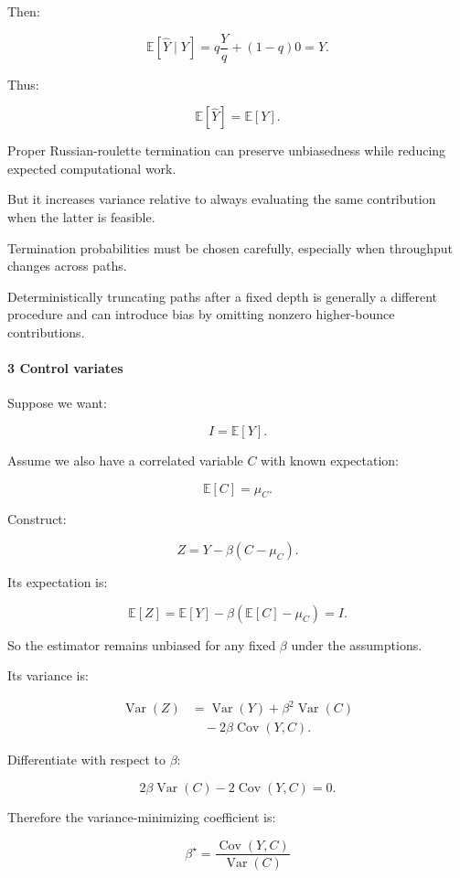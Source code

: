 Then:

\[
 \mathbb E[\widehat Y\mid Y] = q\frac Yq+(1-q)0 =Y.
\]

Thus:

\[
 \boxed{ \mathbb E[\widehat Y]=\mathbb E[Y] }.
\]

Proper Russian-roulette termination can preserve unbiasedness while reducing expected computational work.

But it increases variance relative to always evaluating the same contribution when the latter is feasible.

Termination probabilities must be chosen carefully, especially when throughput changes across paths.

Deterministically truncating paths after a fixed depth is generally a different procedure and can introduce bias by omitting nonzero higher-bounce contributions.

\paragraph{3 Control variates}\label{control-variates}

Suppose we want:

\[
 I=\mathbb E[Y].
\]

Assume we also have a correlated variable \(C\) with known expectation:

\[
 \mathbb E[C]=\mu_C.
\]

Construct:

\[
 \boxed{ Z=Y-\beta(C-\mu_C) }.
\]

Its expectation is:

\[
 \mathbb E[Z] = \mathbb E[Y]-\beta(\mathbb E[C]-\mu_C) =I.
\]

So the estimator remains unbiased for any fixed \(\beta\) under the assumptions.

Its variance is:

\[
 \begin{aligned} \operatorname{Var}(Z) &= \operatorname{Var}(Y) +\beta^2\operatorname{Var}(C)\\ &\quad-2\beta\operatorname{Cov}(Y,C). \end{aligned}
\]

Differentiate with respect to \(\beta\):

\[
 2\beta\operatorname{Var}(C) -2\operatorname{Cov}(Y,C)=0.
\]

Therefore the variance-minimizing coefficient is:

\[
 \boxed{ \beta^\star= \frac{\operatorname{Cov}(Y,C)} {\operatorname{Var}(C)} }
\]

